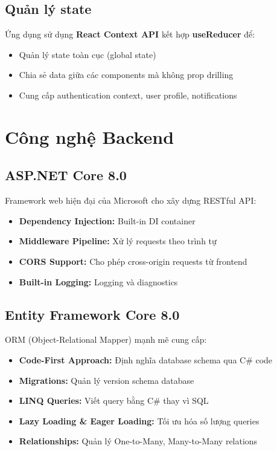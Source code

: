 \subsection{Quản lý state}
Ứng dụng sử dụng \textbf{React Context API} kết hợp \textbf{useReducer} để:

\begin{itemize}
    \item Quản lý state toàn cục (global state)
    \item Chia sẻ data giữa các components mà không prop drilling
    \item Cung cấp authentication context, user profile, notifications
\end{itemize}

\section{Công nghệ Backend}

\subsection{ASP.NET Core 8.0}
Framework web hiện đại của Microsoft cho xây dựng RESTful API:

\begin{itemize}
    \item \textbf{Dependency Injection:} Built-in DI container
    \item \textbf{Middleware Pipeline:} Xử lý requests theo trình tự
    \item \textbf{CORS Support:} Cho phép cross-origin requests từ frontend
    \item \textbf{Built-in Logging:} Logging và diagnostics
\end{itemize}

\subsection{Entity Framework Core 8.0}
ORM (Object-Relational Mapper) mạnh mẽ cung cấp:

\begin{itemize}
    \item \textbf{Code-First Approach:} Định nghĩa database schema qua C\# code
    \item \textbf{Migrations:} Quản lý version schema database
    \item \textbf{LINQ Queries:} Viết query bằng C\# thay vì SQL
    \item \textbf{Lazy Loading \& Eager Loading:} Tối ưu hóa số lượng queries
    \item \textbf{Relationships:} Quản lý One-to-Many, Many-to-Many relations
\end{itemize}

